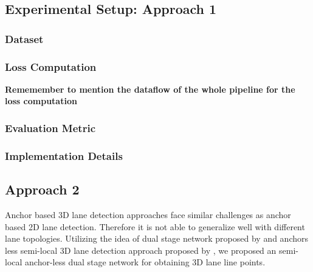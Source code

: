         
        \subsection{Experimental Setup: Approach 1}
        
            \subsubsection{Dataset}
        
            \subsubsection{Loss Computation}
        
                \textbf{Rememember to mention the dataflow of the whole pipeline for the loss computation}
        
        
        
            \subsubsection{Evaluation Metric}
        
            \subsubsection{Implementation Details}
        
        \subsection{Approach 2}
        
        
        Anchor based 3D lane detection approaches face similar challenges as anchor based 2D lane detection. Therefore it is not able to generalize well with different lane topologies. Utilizing the idea of dual stage network proposed by \cite{guo2020gen} and anchors less semi-local 3D lane detection approach proposed by \cite{DBLP:journals/corr/abs-2011-01535}, we proposed an semi-local anchor-less dual stage network for obtaining 3D lane line points.
        
